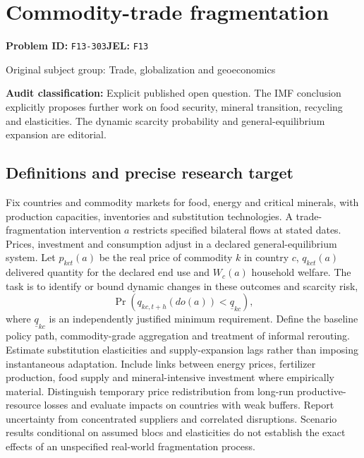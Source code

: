 \documentclass[11pt,a4paper]{article}
\begin{document}
\section*{Commodity-trade fragmentation}
\textbf{Problem ID:} \texttt{F13-303}\quad \textbf{JEL:} \texttt{F13}\par
\label{problem:OP-0348}
{\sffamily\small\color{muted}Original subject group: Trade, globalization and geoeconomics\par}
\label{definitions:problem:30007630}
\textbf{Audit classification:} Explicit published open question. The IMF conclusion explicitly proposes further work on food security, mineral transition, recycling and elasticities. The dynamic scarcity probability and general-equilibrium expansion are editorial.
\subsection*{Definitions and precise research target}
Fix countries and commodity markets for food, energy and critical minerals, with production capacities, inventories and substitution technologies. A trade-fragmentation intervention \(a\) restricts specified bilateral flows at stated dates. Prices, investment and consumption adjust in a declared general-equilibrium system. Let \(p_{kct}(a)\) be the real price of commodity \(k\) in country \(c\), \(q_{kct}(a)\) delivered quantity for the declared end use and \(W_c(a)\) household welfare. The task is to identify or bound dynamic changes in these outcomes and scarcity risk,
\[\Pr(q_{kc,t+h}(do(a))<\underline q_{kc}),\]
where \(\underline q_{kc}\) is an independently justified minimum requirement. Define the baseline policy path, commodity-grade aggregation and treatment of informal rerouting. Estimate substitution elasticities and supply-expansion lags rather than imposing instantaneous adaptation. Include links between energy prices, fertilizer production, food supply and mineral-intensive investment where empirically material. Distinguish temporary price redistribution from long-run productive-resource losses and evaluate impacts on countries with weak buffers. Report uncertainty from concentrated suppliers and correlated disruptions. Scenario results conditional on assumed blocs and elasticities do not establish the exact effects of an unspecified real-world fragmentation process.
\end{document}
